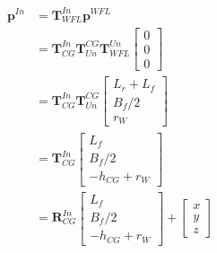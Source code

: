 \begin{align}
  \mathbf{p}^{In} &= \mathbf{T}_{WFL}^{In}\mathbf{p}^{WFL} \\
  &= \mathbf{T}_{CG}^{In}\mathbf{T}_{Un}^{CG}\mathbf{T}_{WFL}^{Un}
  \begin{bmatrix}
    0 \\ 0 \\ 0
  \end{bmatrix} \\
  &= \mathbf{T}_{CG}^{In}\mathbf{T}_{Un}^{CG}
  \begin{bmatrix}
    L_r+L_f \\ B_f/2 \\ r_W
  \end{bmatrix} \\
  &= \mathbf{T}_{CG}^{In}
  \begin{bmatrix}
    L_f \\ B_f/2 \\ -h_{CG} + r_W
  \end{bmatrix} \\
  &=
  \mathbf{R}_{CG}^{In}
  \begin{bmatrix}
    L_f \\ B_f/2 \\ -h_{CG} + r_W
  \end{bmatrix}
  +
  \begin{bmatrix}
    x \\ y \\ z
  \end{bmatrix}
\end{align}





